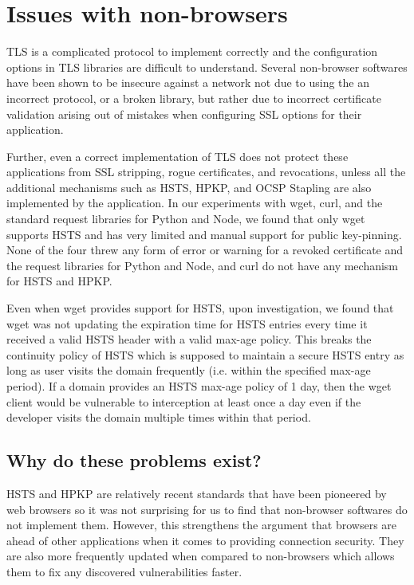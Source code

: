 \section{Issues with non-browsers}
\label{sec:problems-saber}

TLS is a complicated protocol to implement correctly and the configuration
options in TLS libraries are difficult to understand. Several non-browser
softwares have been shown to be insecure against a network not due to using the
an incorrect protocol, or a broken library, but rather due to incorrect
certificate validation arising out of mistakes when configuring SSL options for
their application.

Further, even a correct implementation of TLS does not protect these
applications from SSL stripping, rogue certificates, and revocations, unless
all the additional mechanisms such as HSTS, HPKP, and OCSP Stapling are also
implemented by the application. In our experiments with wget, curl, and the
standard request libraries for Python and Node, we found that only wget
supports HSTS and has very limited and manual support for public key-pinning.
None of the four threw any form of error or warning for a revoked certificate
and the request libraries for Python and Node, and curl do not have any
mechanism for HSTS and HPKP.

Even when wget provides support for HSTS, upon investigation, we found that
wget was not updating the expiration time for HSTS entries every time it
received a valid HSTS header with a valid max-age policy. This breaks the
continuity policy of HSTS which is supposed to maintain a secure HSTS entry as
long as user visits the domain frequently (i.e. within the specified max-age
period). If a domain provides an HSTS max-age policy of 1 day, then the wget
client would be vulnerable to interception at least once a day even if the
developer visits the domain multiple times within that period.

\subsection{Why do these problems exist?}

HSTS and HPKP are relatively recent standards that have been pioneered by web
browsers so it was not surprising for us to find that non-browser softwares do
not implement them. However, this strengthens the argument that browsers are
ahead of other applications when it comes to providing connection security. They
are also more frequently updated when compared to non-browsers which allows them to
fix any discovered vulnerabilities faster.

